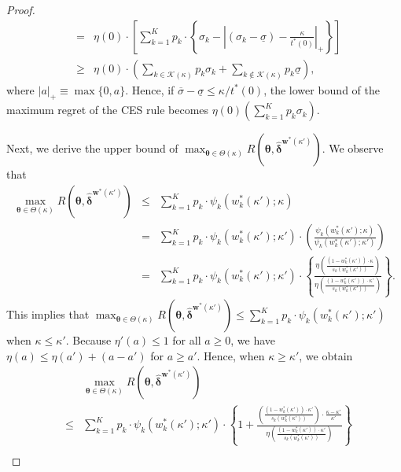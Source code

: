 \documentclass[10pt,a4paper]{amsart}
\begin{document}
\begin{proof}
\begin{eqnarray}
&=& \eta(0) \cdot \left[ \sum_{k=1}^K p_k \cdot \left\{ \sigma_k - \left| (\sigma_k - \underline{\sigma}) - \frac{\kappa}{t^{\ast}(0)} \right|_{+} \right\}  \right] \nonumber \\
& \geq & \eta(0) \cdot \left( \sum_{k \in \mathcal{K}(\kappa)} p_k \sigma_k + \sum_{k \not\in \mathcal{K}(\kappa)} p_k  \underline{\sigma}  \right), \label{CES_lower}
\end{eqnarray}
where $|a|_{+} \equiv \max\{0,a\}$. Hence, if $\overline{\sigma} - \underline{\sigma} \leq \kappa / t^{\ast}(0)$, the lower bound of the maximum regret of the CES rule becomes $\eta(0) \left( \sum_{k=1}^K p_k \sigma_k \right)$.

Next, we derive the upper bound of $\max_{\bm{\theta} \in \Theta(\kappa)} R(\bm{\theta},\hat{\bm{\delta}}^{\bm{w}^*(\kappa')})$. We observe that
\begin{eqnarray*}
\max_{\bm{\theta} \in \Theta(\kappa)} R(\bm{\theta},\hat{\bm{\delta}}^{\bm{w}^*(\kappa')}) &\leq & \sum_{k=1}^K p_k \cdot \psi_k\left( w_k^{\ast}(\kappa') ;\kappa \right)  \\
&=& \sum_{k=1}^K p_k \cdot \psi_k\left( w_k^{\ast}(\kappa') ;\kappa' \right) \cdot \left( \frac{\psi_k\left( w_k^{\ast}(\kappa') ;\kappa \right)}{\psi_k\left( w_k^{\ast}(\kappa') ;\kappa' \right)} \right) \\
&=& \sum_{k=1}^K p_k \cdot \psi_k\left( w_k^{\ast}(\kappa') ;\kappa' \right) \cdot \left\{ \frac{\eta \left( \frac{(1-w_k^{\ast}(\kappa')) \cdot \kappa}{s_k \left( w_k^{\ast}(\kappa') \right)} \right)}{\eta \left( \frac{(1-w_k^{\ast}(\kappa')) \cdot \kappa'}{s_k \left( w_k^{\ast}(\kappa') \right)} \right)} \right\}.
\end{eqnarray*}
This implies that $\max_{\bm{\theta} \in \Theta(\kappa)} R(\bm{\theta},\hat{\bm{\delta}}^{\bm{w}^*(\kappa')}) \leq \sum_{k=1}^K p_k \cdot \psi_k\left( w_k^{\ast}(\kappa') ;\kappa' \right)$ when $\kappa \leq \kappa'$. Because $\eta'(a) \leq 1$ for all $a \geq 0$, we have $\eta(a) \leq \eta(a') + (a-a')$ for $a \geq a'$. Hence, when $\kappa \geq \kappa'$, we obtain
\begin{eqnarray}
& & \max_{\bm{\theta} \in \Theta(\kappa)} R(\bm{\theta},\hat{\bm{\delta}}^{\bm{w}^*(\kappa')}) \nonumber \\
&\leq & \sum_{k=1}^K p_k \cdot \psi_k\left( w_k^{\ast}(\kappa') ;\kappa' \right) \cdot \left\{ 1 + \frac{ \left( \frac{(1-w_k^{\ast}(\kappa'))\cdot \kappa' }{s_k \left( w_k^{\ast}(\kappa') \right)} \right) \cdot \frac{\kappa - \kappa'}{\kappa'}}{\eta \left( \frac{(1-w_k^{\ast}(\kappa')) \cdot \kappa'}{s_k \left( w_k^{\ast}(\kappa') \right)} \right)} \right\} \nonumber \\

\end{eqnarray}
\end{proof}
\end{document}
